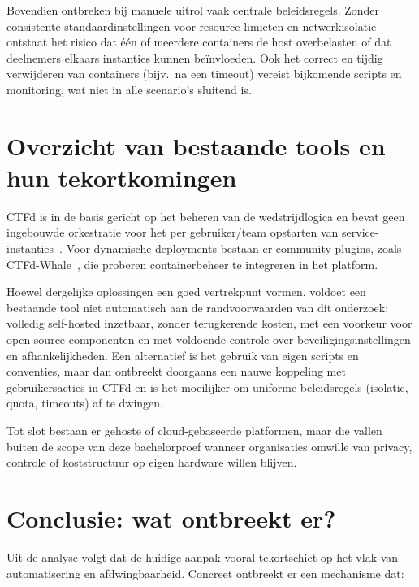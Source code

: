 Bovendien ontbreken bij manuele uitrol vaak centrale beleidsregels. Zonder consistente standaardinstellingen voor resource-limieten en netwerkisolatie ontstaat het risico dat één of meerdere containers de host overbelasten of dat deelnemers elkaars instanties kunnen beïnvloeden. Ook het correct en tijdig verwijderen van containers (bijv.\ na een timeout) vereist bijkomende scripts en monitoring, wat niet in alle scenario's sluitend is.

\section{Overzicht van bestaande tools en hun tekortkomingen}%
\label{sec:asis-tools}

CTFd is in de basis gericht op het beheren van de wedstrijdlogica en bevat geen ingebouwde orkestratie voor het per gebruiker/team opstarten van service-instanties~\autocite{CTFdGitHub,CTFd}. Voor dynamische deployments bestaan er community-plugins, zoals CTFd-Whale~\autocite{CTFdWhale}, die proberen containerbeheer te integreren in het platform.

Hoewel dergelijke oplossingen een goed vertrekpunt vormen, voldoet een bestaande tool niet automatisch aan de randvoorwaarden van dit onderzoek: volledig self-hosted inzetbaar, zonder terugkerende kosten, met een voorkeur voor open-source componenten en met voldoende controle over beveiligingsinstellingen en afhankelijkheden. Een alternatief is het gebruik van eigen scripts en conventies, maar dan ontbreekt doorgaans een nauwe koppeling met gebruikersacties in CTFd en is het moeilijker om uniforme beleidsregels (isolatie, quota, timeouts) af te dwingen.

Tot slot bestaan er gehoste of cloud-gebaseerde platformen, maar die vallen buiten de scope van deze bachelorproef wanneer organisaties omwille van privacy, controle of koststructuur op eigen hardware willen blijven.

\section{Conclusie: wat ontbreekt er?}%
\label{sec:asis-conclusie}

Uit de analyse volgt dat de huidige aanpak vooral tekortschiet op het vlak van automatisering en afdwingbaarheid. Concreet ontbreekt er een mechanisme dat:

